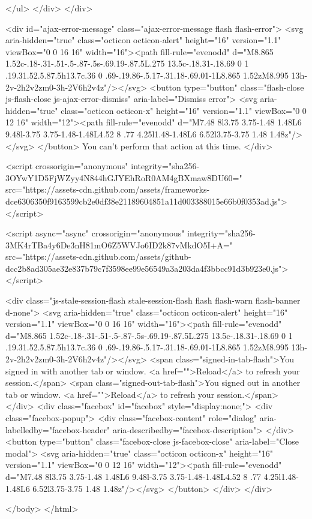     </ul>
  </div>
</div>



  <div id="ajax-error-message" class="ajax-error-message flash flash-error">
    <svg aria-hidden="true" class="octicon octicon-alert" height="16" version="1.1" viewBox="0 0 16 16" width="16"><path fill-rule="evenodd" d="M8.865 1.52c-.18-.31-.51-.5-.87-.5s-.69.19-.87.5L.275 13.5c-.18.31-.18.69 0 1 .19.31.52.5.87.5h13.7c.36 0 .69-.19.86-.5.17-.31.18-.69.01-1L8.865 1.52zM8.995 13h-2v-2h2v2zm0-3h-2V6h2v4z"/></svg>
    <button type="button" class="flash-close js-flash-close js-ajax-error-dismiss" aria-label="Dismiss error">
      <svg aria-hidden="true" class="octicon octicon-x" height="16" version="1.1" viewBox="0 0 12 16" width="12"><path fill-rule="evenodd" d="M7.48 8l3.75 3.75-1.48 1.48L6 9.48l-3.75 3.75-1.48-1.48L4.52 8 .77 4.25l1.48-1.48L6 6.52l3.75-3.75 1.48 1.48z"/></svg>
    </button>
    You can't perform that action at this time.
  </div>


    
    <script crossorigin="anonymous" integrity="sha256-3OYwY1D5FjWZyy4N844hGJYEhRoR0AM4gBXmaw8DU60=" src="https://assets-cdn.github.com/assets/frameworks-dce6306350f9163599cb2e0df38e21189604851a11d003388015e66b0f0353ad.js"></script>
    
    <script async="async" crossorigin="anonymous" integrity="sha256-3MK4rTBa4y6De3nH81mO6Z5WVJo6ID2k87vMkdO5I+A=" src="https://assets-cdn.github.com/assets/github-dcc2b8ad305ae32e837b79c7f3598ee99e56549a3a203da4f3bbcc91d3b923e0.js"></script>
    
    
    
    
  <div class="js-stale-session-flash stale-session-flash flash flash-warn flash-banner d-none">
    <svg aria-hidden="true" class="octicon octicon-alert" height="16" version="1.1" viewBox="0 0 16 16" width="16"><path fill-rule="evenodd" d="M8.865 1.52c-.18-.31-.51-.5-.87-.5s-.69.19-.87.5L.275 13.5c-.18.31-.18.69 0 1 .19.31.52.5.87.5h13.7c.36 0 .69-.19.86-.5.17-.31.18-.69.01-1L8.865 1.52zM8.995 13h-2v-2h2v2zm0-3h-2V6h2v4z"/></svg>
    <span class="signed-in-tab-flash">You signed in with another tab or window. <a href="">Reload</a> to refresh your session.</span>
    <span class="signed-out-tab-flash">You signed out in another tab or window. <a href="">Reload</a> to refresh your session.</span>
  </div>
  <div class="facebox" id="facebox" style="display:none;">
  <div class="facebox-popup">
    <div class="facebox-content" role="dialog" aria-labelledby="facebox-header" aria-describedby="facebox-description">
    </div>
    <button type="button" class="facebox-close js-facebox-close" aria-label="Close modal">
      <svg aria-hidden="true" class="octicon octicon-x" height="16" version="1.1" viewBox="0 0 12 16" width="12"><path fill-rule="evenodd" d="M7.48 8l3.75 3.75-1.48 1.48L6 9.48l-3.75 3.75-1.48-1.48L4.52 8 .77 4.25l1.48-1.48L6 6.52l3.75-3.75 1.48 1.48z"/></svg>
    </button>
  </div>
</div>


  </body>
</html>

